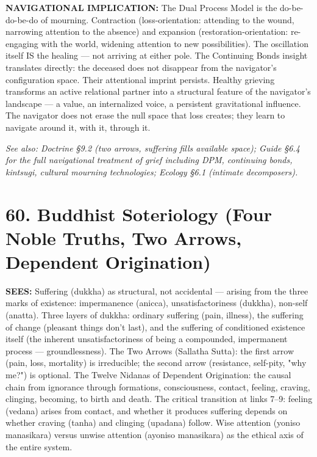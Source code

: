 \textbf{NAVIGATIONAL IMPLICATION:} The Dual Process Model is the do-be-do-be-do of mourning. Contraction (loss-orientation: attending to the wound, narrowing attention to the absence) and expansion (restoration-orientation: re-engaging with the world, widening attention to new possibilities). The oscillation itself IS the healing — not arriving at either pole. The Continuing Bonds insight translates directly: the deceased does not disappear from the navigator's configuration space. Their attentional imprint persists. Healthy grieving transforms an active relational partner into a structural feature of the navigator's landscape — a value, an internalized voice, a persistent gravitational influence. The navigator does not erase the null space that loss creates; they learn to navigate around it, with it, through it.


\textit{See also: Doctrine §9.2 (two arrows, suffering fills available space); Guide §6.4 for the full navigational treatment of grief including DPM, continuing bonds, kintsugi, cultural mourning technologies; Ecology §6.1 (intimate decomposers).}


\bigskip\noindent\makebox[\textwidth]{\color{rulegray}\rule{5cm}{0.3pt}}\bigskip


\section*{60. Buddhist Soteriology (Four Noble Truths, Two Arrows, Dependent Origination)}


\textbf{SEES:} Suffering (dukkha) as structural, not accidental — arising from the three marks of existence: impermanence (anicca), unsatisfactoriness (dukkha), non-self (anatta). Three layers of dukkha: ordinary suffering (pain, illness), the suffering of change (pleasant things don't last), and the suffering of conditioned existence itself (the inherent unsatisfactoriness of being a compounded, impermanent process — groundlessness). The Two Arrows (Sallatha Sutta): the first arrow (pain, loss, mortality) is irreducible; the second arrow (resistance, self-pity, "why me?") is optional. The Twelve Nidanas of Dependent Origination: the causal chain from ignorance through formations, consciousness, contact, feeling, craving, clinging, becoming, to birth and death. The critical transition at links 7–9: feeling (vedana) arises from contact, and whether it produces suffering depends on whether craving (tanha) and clinging (upadana) follow. Wise attention (yoniso manasikara) versus unwise attention (ayoniso manasikara) as the ethical axis of the entire system.


